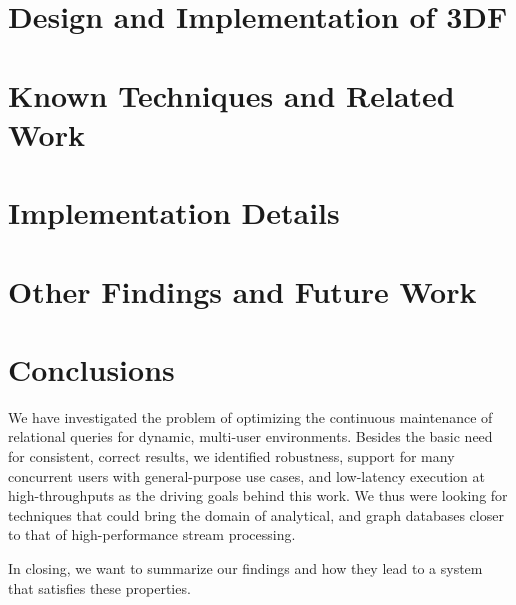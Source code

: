 \documentclass{article}
\begin{document}
\section{Design and Implementation of 3DF} \label{3df}

\newpage

\section{Known Techniques and Related Work} \label{known-techniques}

\newpage



\section{Implementation Details} \label{implementation}


\section{Other Findings and Future Work} \label{future-work}

\newpage

\section{Conclusions} \label{conclusions}

We have investigated the problem of optimizing the continuous
maintenance of relational queries for dynamic, multi-user
environments. Besides the basic need for consistent, correct results,
we identified robustness, support for many concurrent users with
general-purpose use cases, and low-latency execution at
high-throughputs as the driving goals behind this work. We thus were
looking for techniques that could bring the domain of analytical, and
graph databases closer to that of high-performance stream processing.

In closing, we want to summarize our findings and how they lead to a
system that satisfies these properties.
\end{document}
